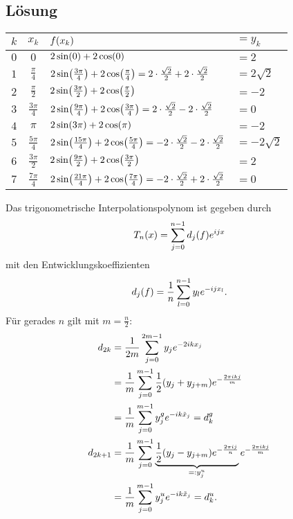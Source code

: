 \documentclass{exercise}
\begin{document}
    \subsection*{Lösung}
    \begin{center}
        \begin{tabular}{ccll}
            \toprule
            \(k\) & \(x_k\) & \(f\parentheses*{x_k}\) & \(= y_k\)\\
            \midrule
            \(0\) & \(0\) & \(2\sin\parentheses*{0} + 2\cos\parentheses*{0}\) & \(= 2\)\\
            \(1\) & \(\frac{\pi}{4}\) & \(2\sin\parentheses*{\frac{3\pi}{4}} + 2\cos\parentheses*{\frac{\pi}{4}} = 2 \cdot \frac{\sqrt{2}}{2} + 2 \cdot \frac{\sqrt{2}}{2}\) & \(= 2\sqrt{2}\)\\
            \(2\) & \(\frac{\pi}{2}\) & \(2\sin\parentheses*{\frac{3\pi}{2}} + 2\cos\parentheses*{\frac{\pi}{2}}\) & \(= -2\)\\
            \(3\) & \(\frac{3\pi}{4}\) & \(2\sin\parentheses*{\frac{9\pi}{4}} + 2\cos\parentheses*{\frac{3\pi}{4}} = 2 \cdot \frac{\sqrt{2}}{2} - 2 \cdot \frac{\sqrt{2}}{2}\) & \(= 0\)\\
            \(4\) & \(\pi\) & \(2\sin\parentheses*{3\pi} + 2\cos\parentheses*{\pi}\) & \(= -2\)\\
            \(5\) & \(\frac{5\pi}{4}\) & \(2\sin\parentheses*{\frac{15\pi}{4}} + 2\cos\parentheses*{\frac{5\pi}{4}} = -2 \cdot \frac{\sqrt{2}}{2} - 2 \cdot \frac{\sqrt{2}}{2}\) & \(= -2\sqrt{2}\)\\
            \(6\) & \(\frac{3\pi}{2}\) & \(2\sin\parentheses*{\frac{9\pi}{2}} + 2\cos\parentheses*{\frac{3\pi}{2}}\) & \(= 2\)\\
            \(7\) & \(\frac{7\pi}{4}\) & \(2\sin\parentheses*{\frac{21\pi}{4}} + 2\cos\parentheses*{\frac{7\pi}{4}} = -2 \cdot \frac{\sqrt{2}}{2} + 2 \cdot \frac{\sqrt{2}}{2}\) & \(= 0\)\\
            \bottomrule
        \end{tabular}
    \end{center}
    Das trigonometrische Interpolationspolynom ist gegeben durch
    \[
        T_n\parentheses*{x} = \sum_{j = 0}^{n - 1}d_j\parentheses*{f}e^{ijx}
    \]
    mit den Entwicklungskoeffizienten
    \[
        d_j\parentheses*{f} = \frac{1}{n}\sum_{l = 0}^{n - 1}y_l e^{-ijx_l}.
    \]
    Für gerades \(n\) gilt mit \(m = \frac{n}{2}\):
    \begin{align*}
        d_{2k} &= \frac{1}{2m}\sum_{j = 0}^{2m - 1}y_j e^{-2ikx_j}\\
        &= \frac{1}{m}\sum_{j = 0}^{m - 1}\frac{1}{2}\parentheses*{y_j + y_{j + m}}e^{-\frac{2\pi ikj}{m}}\\
        &= \frac{1}{m}\sum_{j = 0}^{m - 1}y_j^g e^{-ik\tilde{x}_j} = d_k^g\\
        d_{2k + 1} &= \frac{1}{m}\sum_{j = 0}^{m - 1}\underbrace{\frac{1}{2}\parentheses*{y_j - y_{j + m}}e^{-\frac{2\pi ij}{n}}}_{=: y_j^u}e^{-\frac{2\pi ikj}{m}}\\
        &= \frac{1}{m}\sum_{j = 0}^{m - 1}y_j^u e^{-ik\tilde{x}_j} = d_k^u.
    \end{align*}
\end{document}
